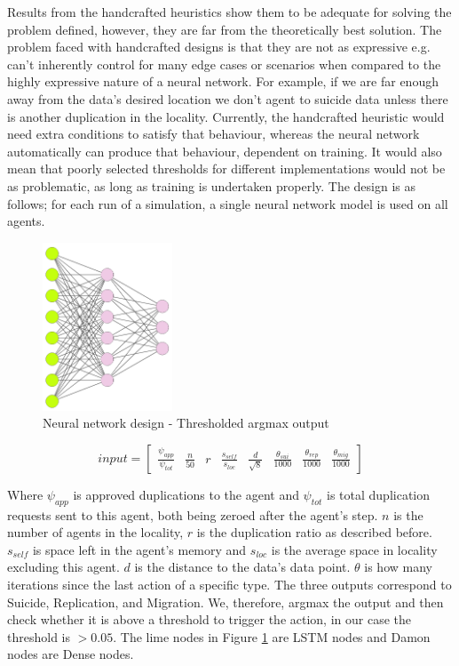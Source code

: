 \documentclass{UoYCSproject}
\begin{document}
Results from the handcrafted heuristics show them to be adequate for solving the problem defined, however, they are far from the theoretically best solution.
The problem faced with handcrafted designs is that they are not as expressive e.g. can’t inherently control for many edge cases or scenarios when compared to the highly expressive nature of a neural network.
For example, if we are far enough away from the data's desired location we don’t agent to suicide data unless there is another duplication in the locality.
Currently, the handcrafted heuristic would need extra conditions to satisfy that behaviour, whereas the neural network automatically can produce that behaviour, dependent on training.
It would also mean that poorly selected thresholds for different implementations would not be as problematic, as long as training is undertaken properly.
The design is as follows; for each run of a simulation, a single neural network model is used on all agents.

\begin{figure}[htb]
\label{fig:Neural network}
\begin{center}
\centering
\includegraphics[height=5cm]{"./ExplanationImgs/NN.png"}
\caption{Neural network design - Thresholded argmax output}
\end{center}
\end{figure}

\begin{equation}
input = \begin{bmatrix} \frac{\psi_{app}}{\psi_{tot}} & \frac{n}{50} & r & \frac{s_{self}}{s_{loc}} & \frac{d}{\sqrt{8}} & \frac{\theta_{sui}}{1000} & \frac{\theta_{rep}}{1000} & \frac{\theta_{mig}}{1000} \end{bmatrix}
\end{equation}

Where $\psi_{app}$ is approved duplications to the agent and $\psi_{tot}$ is total duplication requests sent to this agent, both being zeroed after the agent's step.
$n$ is the number of agents in the locality, $r$ is the duplication ratio as described before.
$s_{self}$ is space left in the agent's memory and $s_{loc}$ is the average space in locality excluding this agent.
$d$ is the distance to the data’s data point.
$\theta$ is how many iterations since the last action of a specific type.
The three outputs correspond to Suicide, Replication, and Migration.
We, therefore, argmax the output and then check whether it is above a threshold to trigger the action, in our case the threshold is $>0.05$.
The lime nodes in Figure \ref{fig:Neural network} are LSTM nodes and Damon nodes are Dense nodes.
\end{document}
